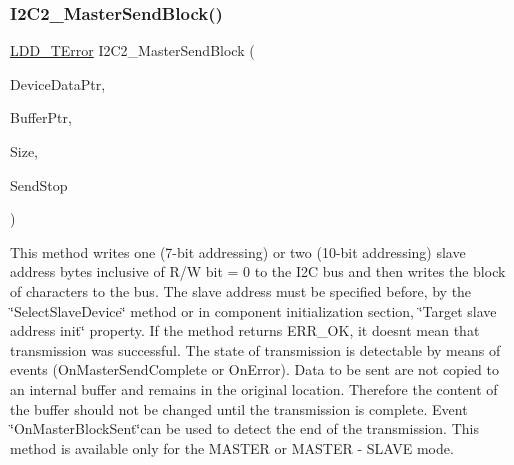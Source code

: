 \subsubsection{\texorpdfstring{I2\+C2\+\_\+\+Master\+Send\+Block()}{I2C2\_MasterSendBlock()}}
{\footnotesize\ttfamily \hyperlink{group___p_e___types__module_ga24c2b045fd04e79e85f261ce4df35588}{L\+D\+D\+\_\+\+T\+Error} I2\+C2\+\_\+\+Master\+Send\+Block (\begin{DoxyParamCaption}\item[{\hyperlink{group___p_e___types__module_gac5cf1362f1f0e3a2ce71b1bf2276d091}{L\+D\+D\+\_\+\+T\+Device\+Data} $\ast$}]{Device\+Data\+Ptr,  }\item[{\hyperlink{group___p_e___types__module_gade8ef9401405bd941b6da738b807f980}{L\+D\+D\+\_\+\+T\+Data} $\ast$}]{Buffer\+Ptr,  }\item[{\hyperlink{group___p_e___types__module_gaa7fd2bc3f1f93e051058f9e70349c2b9}{L\+D\+D\+\_\+\+I2\+C\+\_\+\+T\+Size}}]{Size,  }\item[{\hyperlink{group___p_e___types__module_gacac4ade6fbcd28c9ddcd864242063ec8}{L\+D\+D\+\_\+\+I2\+C\+\_\+\+T\+Send\+Stop}}]{Send\+Stop }\end{DoxyParamCaption})}



This method writes one (7-\/bit addressing) or two (10-\/bit addressing) slave address bytes inclusive of R/W bit = 0 to the I2C bus and then writes the block of characters to the bus. The slave address must be specified before, by the \char`\"{}\+Select\+Slave\+Device\char`\"{} method or in component initialization section, \char`\"{}\+Target slave address init\char`\"{} property. If the method returns E\+R\+R\+\_\+\+OK, it doesn\textquotesingle{}t mean that transmission was successful. The state of transmission is detectable by means of events (On\+Master\+Send\+Complete or On\+Error). Data to be sent are not copied to an internal buffer and remains in the original location. Therefore the content of the buffer should not be changed until the transmission is complete. Event \char`\"{}\+On\+Master\+Block\+Sent\char`\"{}can be used to detect the end of the transmission. This method is available only for the M\+A\+S\+T\+ER or M\+A\+S\+T\+ER -\/ S\+L\+A\+VE mode. 


